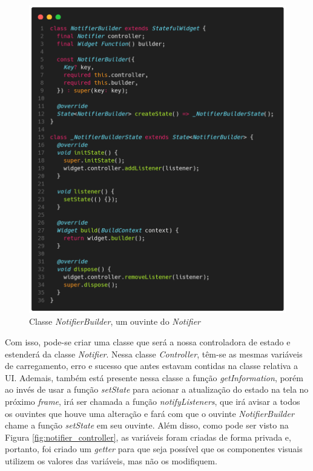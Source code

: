 \documentclass[12pt, %
openright, 
oneside, %
a4paper,    %
brazil]{facom-ufu-abntex2}
\begin{document}
\begin{figure}[ht]
    \centering
    \includegraphics[width=.65\textwidth, trim={0 30 0 100}, clip]{figures/states/notifier_builder.png}
    \caption{Classe \textit{NotifierBuilder}, um ouvinte do \textit{Notifier}}
    \label{fig:notifier_builder}
\end{figure}

Com isso, pode-se criar uma classe que será a nossa controladora de estado e estenderá da classe \textit{Notifier}. Nessa classe \textit{Controller}, têm-se as mesmas variáveis de carregamento, erro e sucesso que antes estavam contidas na classe relativa a UI. Ademais, também está presente nessa classe a função \textit{getInformation}, porém ao invés de usar a função \textit{setState} para acionar a atualização do estado na tela no próximo \textit{frame}, irá ser chamada a função \textit{notifyListeners}, que irá avisar a todos os ouvintes que houve uma alteração e fará com que o ouvinte \textit{NotifierBuilder} chame a função \textit{setState} em seu ouvinte. Além disso, como pode ser visto na Figura \ref{fig:notifier_controller}, as variáveis foram criadas de forma privada e, portanto, foi criado um \textit{getter} para que seja possível que os componentes visuais utilizem os valores das variáveis, mas não os modifiquem.
\end{document}
